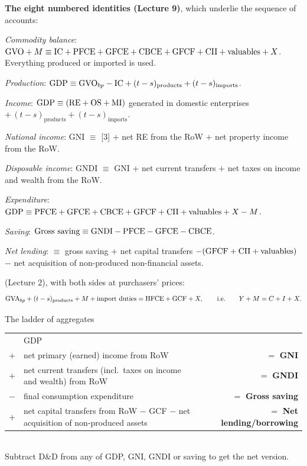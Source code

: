 \textbf{The eight numbered identities (Lecture 9)}, which underlie the sequence of accounts:
\begin{enumerate}[label={[\arabic*]},leftmargin=2.2em]
\item \emph{Commodity balance}: $\mathrm{GVO}+M \equiv \mathrm{IC}+\mathrm{PFCE}+\mathrm{GFCE}+\mathrm{CBCE}+\mathrm{GFCF}+\mathrm{CII}+\text{valuables}+X$.
  Everything produced or imported is used.
\item \emph{Production}: $\mathrm{GDP}\equiv\mathrm{GVO}_{bp}-\mathrm{IC}+(t-s)_{\text{products}}+(t-s)_{\text{imports}}$.
\item \emph{Income}: $\mathrm{GDP}\equiv(\mathrm{RE}+\mathrm{OS}+\mathrm{MI})$ generated in domestic enterprises
  $+\,(t-s)_{\text{products}}+(t-s)_{\text{imports}}$.
\item \emph{National income}: GNI $\equiv$ [3] $+$ net RE from the RoW $+$ net property income
  from the RoW.
\item \emph{Disposable income}: GNDI $\equiv$ GNI $+$ net current transfers $+$ net taxes on
  income and wealth from the RoW.
\item \emph{Expenditure}: $\mathrm{GDP}\equiv\mathrm{PFCE}+\mathrm{GFCE}+\mathrm{CBCE}+\mathrm{GFCF}+\mathrm{CII}+\text{valuables}+X-M$.
\item \emph{Saving}: $\text{Gross saving}\equiv\mathrm{GNDI}-\mathrm{PFCE}-\mathrm{GFCE}-\mathrm{CBCE}$.
\item \emph{Net lending}: $\equiv$ gross saving $+$ net capital transfers $-(\mathrm{GFCF}+\mathrm{CII}+\text{valuables})$
  $-$ net acquisition of non-produced non-financial assets.
\end{enumerate}

 (Lecture 2), with both sides at purchasers' prices:
\[
\mathrm{GVA}_{bp}+(t-s)_{\text{products}}+M+\text{import duties}=\mathrm{HFCE}+\mathrm{GCF}+X,
\qquad\text{i.e.}\qquad Y+M=C+I+X.
\]

\begin{keybox}{The ladder of aggregates}
\small
\begin{tabularx}{\linewidth}{@{}r X r@{}}
& GDP & \\
$+$ & net primary (earned) income from RoW & $=$ \textbf{GNI} \\
$+$ & net current transfers (incl.\ taxes on income and wealth) from RoW & $=$ \textbf{GNDI} \\
$-$ & final consumption expenditure & $=$ \textbf{Gross saving} \\
$+$ & net capital transfers from RoW $-$ GCF $-$ net acquisition of non-produced assets &
$=$ \textbf{Net lending/borrowing} \\
\end{tabularx}\\[2pt]
Subtract D\&D from any of GDP, GNI, GNDI or saving to get the net version.
\end{keybox}

